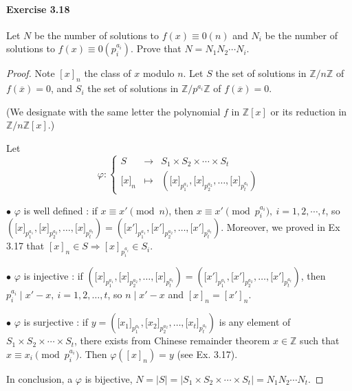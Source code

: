 \documentclass{article}
\begin{document}
\paragraph{Exercise 3.18} Let $N$ be the number of solutions to $f(x) \equiv 0(n)$ and $N_{i}$ be the number of solutions to $f(x) \equiv 0\left(p_{i}^{a_{i}}\right)$. Prove that $N=N_{1} N_{2} \cdots N_{i}$.
\begin{proof}    
Note $[x]_n$ the class of $x$ modulo $n$. Let $S$ the set of solutions in $\mathbb{Z}/n\mathbb{Z}$ of $f(\overline{x}) = 0$, and $S_i$ the set of solutions in $\mathbb{Z}/p^{a_i}\mathbb{Z}$ of $f(\overline{x}) = 0$.

(We designate with the same letter the polynomial $f$ in $\mathbb{Z}[x]$ or its reduction in $\mathbb{Z}/n\mathbb{Z}[x]$.)

Let
$$\varphi :
\left\{
\begin{array}{ccc}
  S&  \to  & S_1\times S_2\times \cdots\times S_t  \\
  {[}x{]}_n& \mapsto   & ({[}x{]}_{p_1^{a_1}}, {[}x{]}_{p_2^{a_2}},\ldots, {[}x{]}_{p_t^{a_t}})    
\end{array}
\right.
$$

$\bullet$ $\varphi$ is well defined : if $x \equiv x' \pmod n$, then $x \equiv x' \pmod {p_i^{a_i}},\ i=1,2,\cdots,t$, so $({[}x{]}_{p_1^{a_1}}, {[}x{]}_{p_2^{a_2}},\ldots, {[}x{]}_{p_t^{a_t}}) =({[}x'{]}_{p_1^{a_1}}, {[}x'{]}_{p_2^{a_2}},\ldots, {[}x'{]}_{p_t^{a_t}})$.  Moreover, we proved in Ex 3.17 that $[x]_n \in S \Rightarrow [x]_{p_i^{a_i}} \in S_i$.

$\bullet$ $\varphi$ is injective : if $({[}x{]}_{p_1^{a_1}}, {[}x{]}_{p_2^{a_2}},\ldots, {[}x{]}_{p_t^{a_t}}) =({[}x'{]}_{p_1^{a_1}}, {[}x'{]}_{p_2^{a_2}},\ldots, {[}x'{]}_{p_t^{a_t}})$, then $p_i^{a_i} \mid x'-x,\ i=1,2,\ldots,t$, so $n \mid x'-x$ and $[x]_n = [x']_n$.

$\bullet$ $\varphi$ is surjective : if $y=({[}x_1{]}_{p_1^{a_1}}, {[}x_2{]}_{p_2^{a_2}},\ldots, {[}x_t{]}_{p_t^{a_t}})$ is any element of $S_1\times S_2\times \cdots\times S_t$, there exists from Chinese remainder theorem $x \in \mathbb{Z}$ such that $x\equiv x_i \pmod {p_i^{a_i}}$. Then $\varphi([x]_n) = y$ (see Ex. 3.17).

In conclusion, a $\varphi$ is bijective,  $N = \vert S \vert = \vert S_1\times S_2\times \cdots\times S_t \vert= N_1N_2\cdots N_t$.
\end{proof}
\end{document}
